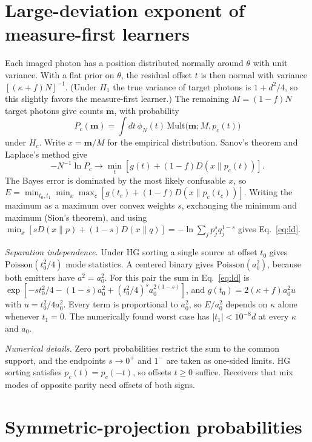 
\section{Large-deviation exponent of measure-first learners}
\label{app:ld}

Each imaged photon has a position distributed normally around $\theta$ with unit variance. With a flat prior on
$\theta$, the residual offset $t$ is then normal with variance $[(\kappa+f)N]^{-1}$. (Under $H_1$ the true variance
of target photons is $1+d^2/4$, so this slightly favors the measure-first learner.) The remaining $M=(1-f)N$ target
photons give counts $\bm m$, with probability
\begin{equation}
P_c(\bm m)=\int dt\,\phi_N(t)\,\mathrm{Mult}\big(\bm m;M,p_c(t)\big)
\end{equation}
under $H_c$. Write $x=\bm m/M$ for the empirical distribution. Sanov's theorem and Laplace's method give
\begin{equation}
-N^{-1}\ln P_c\to\min_t[g(t)+(1-f)D(x\|p_c(t))].
\end{equation}
The Bayes error is dominated by the most likely confusable $x$, so
$E=\min_{t_0,t_1}\min_x\max_c[g(t_c)+(1-f)D(x\|p_c(t_c))]$. Writing the maximum as a maximum over convex weights
$s$, exchanging the minimum and maximum (Sion's theorem), and using
$\min_x[sD(x\|p)+(1-s)D(x\|q)]=-\ln\sum_jp_j^sq_j^{1-s}$ gives Eq.~\eqref{eq:ld}.

\emph{Separation independence.} Under HG sorting a single source at offset $t_0$ gives
$\mathrm{Poisson}(t_0^2/4)$ mode statistics. A centered binary gives $\mathrm{Poisson}(a_0^2)$, because both emitters
have $a^2=a_0^2$. For this pair the sum in Eq.~\eqref{eq:ld} is
$\exp[-st_0^2/4-(1-s)a_0^2+(t_0^2/4)^sa_0^{2(1-s)}]$, and $g(t_0)=2(\kappa+f)a_0^2u$ with $u=t_0^2/4a_0^2$. Every term
is proportional to $a_0^2$, so $E/a_0^2$ depends on $\kappa$ alone whenever $t_1=0$. The numerically found worst
case has $|t_1|<10^{-8}d$ at every $\kappa$ and $a_0$.

\emph{Numerical details.} Zero port probabilities restrict the sum to the common support, and the endpoints
$s\to0^+$ and $1^-$ are taken as one-sided limits. HG sorting satisfies $p_c(t)=p_c(-t)$, so offsets $t\ge0$
suffice. Receivers that mix modes of opposite parity need offsets of both signs.

\section{Symmetric-projection probabilities}
\label{app:sym}

